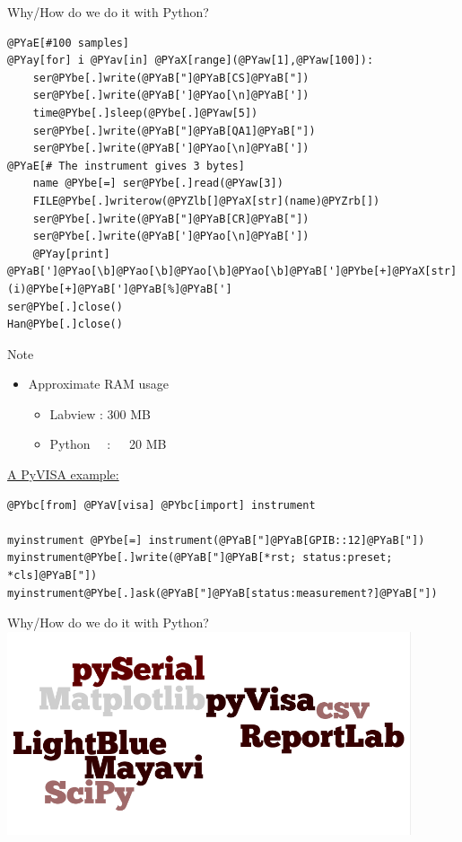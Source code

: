 \documentclass{beamer}
\begin{document}
\begin{frame}[fragile]{Why/How do we do it with Python?}
\begin{Verbatim}[commandchars=@\[\]]                                               
@PYaE[#100 samples]
@PYay[for] i @PYav[in] @PYaX[range](@PYaw[1],@PYaw[100]):
    ser@PYbe[.]write(@PYaB["]@PYaB[CS]@PYaB["])
    ser@PYbe[.]write(@PYaB[']@PYao[\n]@PYaB['])
    time@PYbe[.]sleep(@PYbe[.]@PYaw[5])
    ser@PYbe[.]write(@PYaB["]@PYaB[QA1]@PYaB["])
    ser@PYbe[.]write(@PYaB[']@PYao[\n]@PYaB['])
@PYaE[# The instrument gives 3 bytes]
    name @PYbe[=] ser@PYbe[.]read(@PYaw[3])
    FILE@PYbe[.]writerow(@PYZlb[]@PYaX[str](name)@PYZrb[])
    ser@PYbe[.]write(@PYaB["]@PYaB[CR]@PYaB["])
    ser@PYbe[.]write(@PYaB[']@PYao[\n]@PYaB['])
    @PYay[print] @PYaB[']@PYao[\b]@PYao[\b]@PYao[\b]@PYao[\b]@PYaB[']@PYbe[+]@PYaX[str](i)@PYbe[+]@PYaB[']@PYaB[%]@PYaB[']
ser@PYbe[.]close()
Han@PYbe[.]close()
\end{Verbatim}
\end{frame}
\begin{frame}[fragile]{Note}
  \begin{block}{}
  \begin{itemize}
  	\item Approximate RAM usage 
	\begin{itemize}
		\item Labview : 300 MB 
		\item Python \ \ :\ \ \  20 MB
	\end{itemize}
  \end{itemize}
\end{block}
\underline{A PyVISA example:}
\begin{Verbatim}[commandchars=@\[\]]
@PYbc[from] @PYaV[visa] @PYbc[import] instrument

myinstrument @PYbe[=] instrument(@PYaB["]@PYaB[GPIB::12]@PYaB["])
myinstrument@PYbe[.]write(@PYaB["]@PYaB[*rst; status:preset; *cls]@PYaB["])
myinstrument@PYbe[.]ask(@PYaB["]@PYaB[status:measurement?]@PYaB["])
\end{Verbatim}
\end{frame}

\begin{frame}{Why/How do we do it with Python?}
    \includegraphics[width=119mm,height=60mm]{modules.png}
\end{frame}
\end{document}
